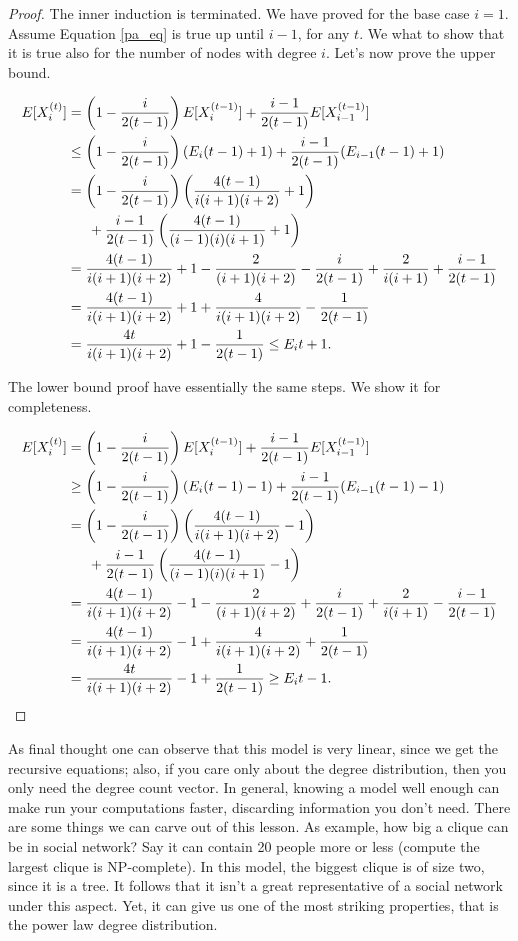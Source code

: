 \begin{proof}
The inner induction is terminated. We have proved for the base case $i = 1$. Assume Equation \ref{pa_eq} is true up until $i-1$, for any $t$. We what to show that it is true also for the number of nodes with degree $i$. Let's now prove the upper bound.

\begin{align}
E[X_i^{(t)}] &= \left(1-\frac{i}{2(t-1)}\right)E[X_i^{(t-1)}] +\frac{i -1}{2(t-1)}E[X_{i-1}^{(t-1)}]\\
&\leq \left(1-\frac{i}{2(t-1)}\right)(E_i(t-1)+1) +\frac{i -1}{2(t-1)}(E_{i-1}(t-1)+1)\\
&=\left(1-\frac{i}{2(t-1)}\right)\left(\frac{4(t-1)}{i(i+1)(i+2)}+1\right)\\
&\indent+\frac{i -1}{2(t-1)}\left(\frac{4(t-1)}{(i-1)(i)(i+1)}+1\right)\\
&=\frac{4(t-1)}{i(i+1)(i+2)} + 1 -\frac{2}{(i+1)(i+2)} -\frac{i}{2(t-1)} + \frac{2}{i(i+1)} + \frac{i-1}{2(t-1)}\\
&=\frac{4(t-1)}{i(i+1)(i+2)} + 1 +\frac{4}{i(i+1)(i+2)} -\frac{1}{2(t-1)}\\
&=\frac{4t}{i(i+1)(i+2)} + 1 -\frac{1}{2(t-1)} \leq E_it+1.
\end{align}

The lower bound proof have essentially the same steps. We show it for completeness.

\begin{align}
E[X_i^{(t)}] &= \left(1-\frac{i}{2(t-1)}\right)E[X_i^{(t-1)}] +\frac{i -1}{2(t-1)}E[X_{i-1}^{(t-1)}]\\
&\geq \left(1-\frac{i}{2(t-1)}\right)(E_i(t-1)-1) +\frac{i -1}{2(t-1)}(E_{i-1}(t-1)-1)\\
&=\left(1-\frac{i}{2(t-1)}\right)\left(\frac{4(t-1)}{i(i+1)(i+2)}-1\right)\\
&\indent+\frac{i -1}{2(t-1)}\left(\frac{4(t-1)}{(i-1)(i)(i+1)}-1\right)\\
&=\frac{4(t-1)}{i(i+1)(i+2)} -1 -\frac{2}{(i+1)(i+2)} +\frac{i}{2(t-1)} + \frac{2}{i(i+1)} - \frac{i-1}{2(t-1)}\\
&=\frac{4(t-1)}{i(i+1)(i+2)} -1 +\frac{4}{i(i+1)(i+2)} +\frac{1}{2(t-1)}\\
&=\frac{4t}{i(i+1)(i+2)} -1 +\frac{1}{2(t-1)} \geq E_it-1.
\end{align}
\end{proof}

As final thought one can observe that this model is very linear, since we get the recursive equations; also, if you care only about the degree distribution, then you only need the degree count vector. In general, knowing a model well enough can make run your computations faster, discarding information you don't need. There are some things we can carve out of this lesson. As example, how big a clique can be in social network? Say it can contain 20 people more or less (compute the largest clique is NP-complete). In this model, the biggest clique is of size two, since it is a tree. It follows that it isn't a great representative of a social network under this aspect. Yet, it can give us one of the most striking properties, that is the power law degree distribution.

